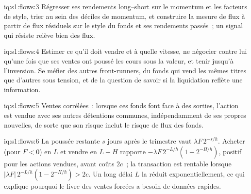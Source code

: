 \begin{solution}{iq:s1:flows:3}
Régresser ses rendements long--short sur le momentum et les facteurs de style, trier au sein des déciles de momentum, et construire la mesure de flux à partir de flux résiduels sur le style
du fonds et ses rendements passés~; un signal qui résiste relève bien des flux.
\end{solution}

\begin{solution}{iq:s1:flows:4}
Estimer ce qu'il doit vendre et à quelle vitesse, ne négocier contre lui qu'une fois que ses ventes ont poussé les cours sous la valeur, et tenir jusqu'à l'inversion. Se méfier des autres
front-runners, du fonds qui vend les mêmes titres que d'autres sous tension, et de la question de savoir si la liquidation reflète une information.
\end{solution}

\begin{solution}{iq:s1:flows:5}
Ventes corrélées~: lorsque ces fonds font face à des sorties, l'action est vendue avec ses autres détentions communes, indépendamment de ses propres nouvelles, de sorte que son risque inclut le
risque de flux des fonds.
\end{solution}

\begin{solution}{iq:s1:flows:6}
La poussée restante $s$ jours après le trimestre vaut $\lambda F\,2^{-s/h}$. Acheter (pour $F < 0$) en $L$ et vendre en $L + H$ rapporte
$-\lambda F\,2^{-L/h}(1 - 2^{-H/h})$, positif pour les actions vendues, avant coûts $2c$~; la transaction est rentable lorsque $|\lambda F|\,2^{-L/h}(1 - 2^{-H/h}) > 2c$. Un long délai
$L$ la réduit exponentiellement, ce qui explique pourquoi le livre des ventes forcées a besoin de données rapides.
\end{solution}
